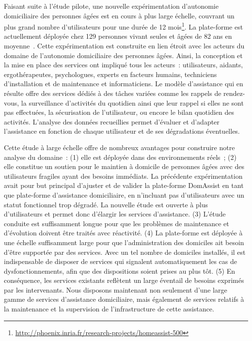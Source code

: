 Faisant suite à l'étude pilote, une nouvelle expérimentation
d'autonomie domiciliaire des personnes âgées est en cours à plus large
échelle, couvrant un plus grand nombre d'utilisateurs pour une durée
de 12 mois\footnote{\url{http://phoenix.inria.fr/research-projects/homeassist-500}}. La plate-forme est actuellement déployée chez 129
personnes vivant seules et âgées de 82 ans en
moyenne~.  Cette expérimentation est
construite en lien étroit avec les acteurs du domaine de l'autonomie
domiciliaire des personnes âgées. Ainsi, la conception et la mise en
place des services ont impliqué tous les acteurs~: utilisateurs,
aidants, ergothérapeutes, psychologues, experts en facteurs humains,
techniciens d'installation et de maintenance et informaticiens.  Le
modèle d'assistance qui en résulte offre des services dédiés à des
tâches variées comme les rappels de rendez-vous, la surveillance
d'activités du quotidien ainsi que leur rappel si elles ne sont pas
effectuées, la sécurisation de l'utilisateur, ou encore le bilan
quotidien des activités.  L'analyse des données recueillies permet
d'évaluer et d'adapter l'assistance en fonction de chaque utilisateur
et de ses dégradations éventuelles.

Cette étude à large échelle offre de nombreux avantages pour
construire notre analyse du domaine~: (1) elle est déployée dans des
environnements réels~; (2) elle constitue un soutien pour le maintien
à domicile de personnes âgées avec des utilisateurs fragiles ayant des
besoins immédiats. La précédente expérimentation avait pour but
principal d'ajuster et de valider la plate-forme DomAssist en tant que
plate-forme d'assistance domiciliaire, en n'incluant pas
d'utilisateurs avec un statut fonctionnel trop dégradé. La nouvelle
étude est ouverte à plus d'utilisateurs et permet donc d'élargir les
services d'assistance. (3) L'étude conduite est suffisamment longue
pour que les problèmes de maintenance et d'évolution doivent être
traités avec réactivité. (4) La plate-forme est déployée à une échelle
suffisamment large pour que l'administration des domiciles ait besoin
d'être supportée par des services. Avec un tel nombre de domiciles
installés, il est indispensable de disposer de services qui signalent
automatiquement les cas de dysfonctionnements, afin que des
dispositions soient prises au plus tôt. (5) En conséquence, les
services existants reflètent un large éventail de besoins exprimés par
les intervenants.  Nous disposons maintenant non seulement d'une large
gamme de services d'assistance domiciliaire, mais également de services
relatifs à la maintenance et la supervision de l'infrastructure de
cette assistance.

